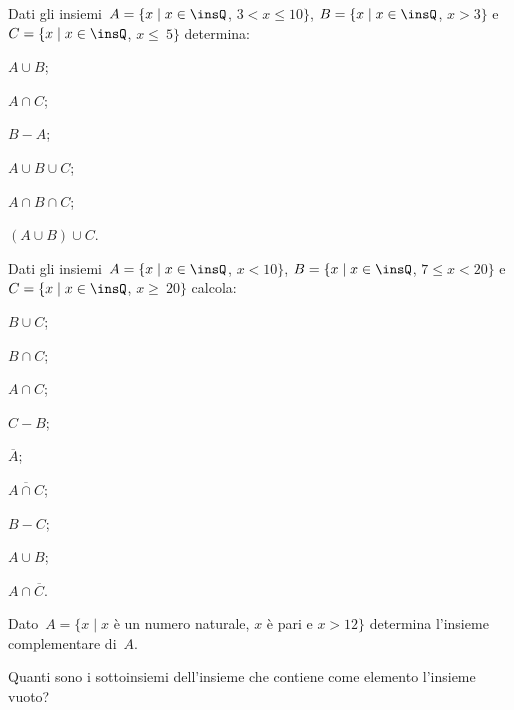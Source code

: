 \begin{esercizio}
\label{ese:5.130}
Dati gli insiemi~$A=\{x\mid x\in\insQ$, $3<x\le 10\}$, $B=\{x\mid x\in\insQ$, $x>3\}$ e
$C=\{x\mid x\in\insQ$, $x\le~5\}$ determina:
\begin{multicols}{3}
\begin{enumeratea}
\item $A\cup B$;
\item $A\cap C$;
\item $B-A$;
\item $A\cup B\cup C$;
\item $A\cap B\cap C$;
\item $(A\cup B)\cup C$.
\end{enumeratea}
\end{multicols}
\end{esercizio}
\pagebreak
\begin{esercizio}
\label{ese:5.131}
Dati gli insiemi~$A=\{x\mid x\in\insQ$, $x<10\}$, $B=\{x\mid x\in\insQ$, $7\le x<20\}$ e
$C=\{x\mid x\in\insQ$, $x\ge~20\}$ calcola:
\begin{multicols}{3}
\begin{enumeratea}
\item $B\cup C$;
\item $B\cap C$;
\item $A\cap C$;
\item $C-B$;
\item $\overline{A}$;
\item $\overline{A\cap C}$;
\item $B-C$;
\item $A\cup B$;
\item $A\cap \overline{C}$.
\end{enumeratea}
\end{multicols}
\end{esercizio}

\begin{esercizio}
\label{ese:5.132}
Dato~$A = \{x\mid x$ è un numero naturale, $x$ è pari e $x>12\}$ determina l'insieme complementare di~$A$.
\end{esercizio}

\begin{esercizio}
\label{ese:5.133}
Quanti sono i sottoinsiemi dell'insieme che contiene come elemento
l'insieme vuoto?
\end{esercizio}


